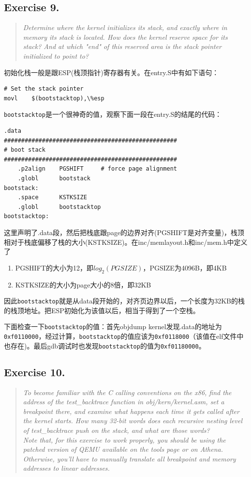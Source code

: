 \subsection{Exercise 9.} 
\begin{quote} \textit{Determine where the kernel initializes its stack, and exactly where in memory its stack is located. How does the kernel reserve space for its stack? And at which "end" of this reserved area is the stack pointer initialized to point to?} \end{quote}

初始化栈一般是跟ESP(栈顶指针)寄存器有关。在entry.S中有如下语句：
\begin{lstlisting}[language={[x86masm]Assembler}]
# Set the stack pointer
movl	$(bootstacktop),\%esp
\end{lstlisting}

\lstinline{bootstacktop}是一个很神奇的值，观察下面一段在entry.S的结尾的代码：
\begin{lstlisting}[language={[x86masm]Assembler}]
.data
##################################################
# boot stack
##################################################
    .p2align	PGSHIFT		# force page alignment
    .globl		bootstack
bootstack:
    .space		KSTKSIZE
    .globl		bootstacktop   
bootstacktop:
\end{lstlisting}

这里声明了.data段，然后把栈底跟page的边界对齐(PGSHIFT是对齐变量)，栈顶相对于栈底偏移了栈的大小(KSTKSIZE)。在inc/memlayout.h和inc/mem.h中定义了
\begin{enumerate}
\item PGSHIFT的大小为12，即$log_2(PGSIZE)$，PGSIZE为4096B，即4KB
\item KSTKSIZE的大小为page大小的8倍，即32KB
\end{enumerate}

因此\lstinline{bootstacktop}就是从data段开始的，对齐页边界以后，一个长度为32KB的栈的栈顶地址。把ESP初始化为该值以后，相当于得到了一个空栈。

下面检查一下\lstinline{bootstacktop}的值：首先objdump kernel发现.data的地址为\lstinline{0xf0110000}，经过计算，\lstinline{bootstacktop}的值应该为\lstinline{0xf0118000}（该值在elf文件中也存在)。最后gdb调试时也发现\lstinline{bootstacktop}的值为\lstinline{0xf01180000}。


\subsection{Exercise 10.} 
\begin{quote} \textit{To become familiar with the C calling conventions on the x86, find the address of the test\_backtrace function in obj/kern/kernel.asm, set a breakpoint there, and examine what happens each time it gets called after the kernel starts. How many 32-bit words does each recursive nesting level of test\_backtrace push on the stack, and what are those words?\\
Note that, for this exercise to work properly, you should be using the patched version of QEMU available on the tools page or on Athena. Otherwise, you'll have to manually translate all breakpoint and memory addresses to linear addresses.} \end{quote}

